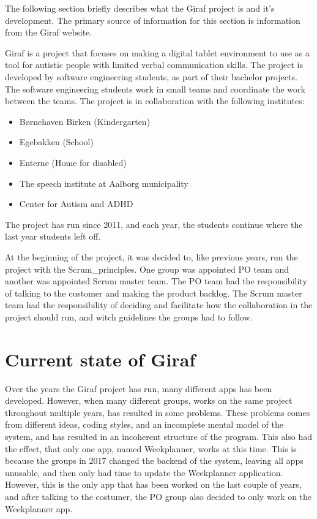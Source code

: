 
The following section briefly describes what the Giraf project is and it's development. The primary source of information for this section is information from the Giraf website\cite{GirafWebsite}.


Giraf is a project that focuses on making a digital tablet environment to use as a tool for autistic people with limited verbal communication skills. The project is developed by software engineering students, as part of their bachelor projects.  The software engineering students work in small teams and coordinate the work between the teams. The project is in collaboration with the following institutes:

\begin{itemize}
    \item Børnehaven Birken (Kindergarten) \cite{bhBirken} 
    \item Egebakken (School) \cite{egebakken} 
    \item Enterne (Home for disabled) \cite{enterne}
    \item The speech institute at Aalborg municipality %
    \item Center for Autism and ADHD \cite{center_for_autism}
\end{itemize} 
The project has run since 2011, and each year, the students continue where the last year students left off.

At the beginning of the project, it was decided to, like previous years, run the project with the \gls{Scrum_principles}. One group was appointed \gls{PO} team and another was appointed Scrum master team. The \gls{PO} team had the responsibility of talking to the customer and making the product backlog. The Scrum master team had the responsibility of deciding and facilitate how the collaboration in the project should run, and witch guidelines the groups had to follow. 

\section{Current state of Giraf}

Over the years the Giraf project has run, many different apps has been developed. However, when many different groups, works on the same project throughout multiple years,  has resulted in some problems. \newline
These problems comes from different ideas, coding styles, and an incomplete mental model of the system, and has resulted in an incoherent structure of the program.  \newline
This also had the effect, that only one app, named Weekplanner, works at this time. This is because the groups in 2017 \cite{SW608F18} changed the backend of the system, leaving all apps unusable, and then only had time to update the Weekplanner application. \newline
However, this is the only app that has been worked on the last couple of years, and after talking to the costumer, the \gls{PO} group also decided to only work on the Weekplanner app.  \newline 

